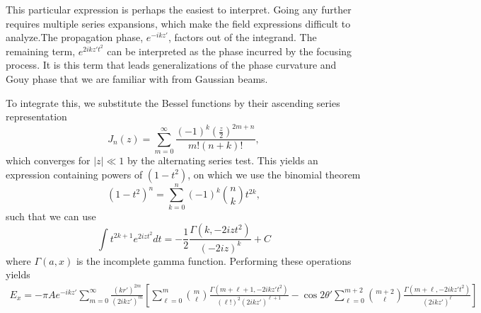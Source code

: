 \documentclass[11pt,SymmetricalJury]{inrsthesis/inrsthesis}
\begin{document}
This particular expression is perhaps the easiest to interpret. Going any further
requires multiple series expansions, which make the field expressions difficult
to analyze.The propagation phase, $e^{-ikz'}$, factors out of the integrand.
The remaining term, $e^{2ikz't^2}$ can be interpreted as the phase incurred
by the focusing process. It is this term that leads generalizations of the
phase curvature and Gouy phase that we are familiar with from Gaussian beams.

To integrate this, we substitute the Bessel functions by their ascending series
representation
\cite[\S9.1.10]{Abramowitz1965}
  \begin{equation}
    J_n(z) = \sum_{m=0}^\infty
      \frac{(-1)^k\left(\frac{z}{2}\right)^{2m+n}}{m!(n+k)!},
  \end{equation}
which converges for $|z|\ll1$ by the alternating series test. This yields
an expression containing powers of $(1-t^2)$, on which we use the binomial
theorem
  \begin{equation}
    (1-t^2)^n = \sum_{k=0}^n (-1)^k\binom{n}{k} t^{2k},
  \end{equation}
such that we can use
  \begin{equation}
    \int t^{2k+1}e^{2izt^2}dt = -\frac{1}{2}\frac{\Gamma(k,-2izt^2)}{(-2iz)^k} +C
  \end{equation}
where $\Gamma(a,x)$ is the incomplete gamma function. Performing these operations
yields
  \begin{subequations}
  \begin{align}
    E_x = -\pi Ae^{-ikz'}\sum_{m=0}^\infty\frac{(kr')^{2m}}{(2ikz')^{m}}
      \left[\sum_{\ell=0}^m\binom{m}{\ell}\frac{\Gamma(m+\ell+1,-2ikz't^2)}{(\ell!)^2(2ikz')^{\ell+1}}
           -\cos2\theta'\sum_{\ell=0}^{m+2}\binom{m+2}{\ell}\frac{\Gamma(m+\ell,-2ikz't^2)}{(2ikz')^\ell}\right]
  \end{align}
  \end{subequations}
\end{document}
